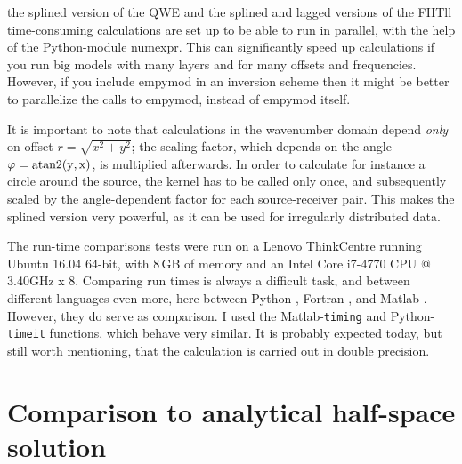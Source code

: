 \documentclass[manuscript,revised]{geophysics}
\begin{document}
  the splined
version of the QWE and the splined and lagged versions of the FHTll time-consuming calculations are set up to be able to
run in parallel, with the help of the Python-module numexpr.  This can
significantly speed up calculations if you run big models with many layers and
for many offsets and frequencies. However, if you include empymod in an
inversion scheme then it might be better to parallelize the calls to empymod,
instead of empymod itself.

It is important to note that calculations in the wavenumber domain depend
\emph{only} on offset $r = \sqrt{x^2+y^2}$; the scaling factor, which depends
on the angle $\varphi = \rm{atan2}(y, x)$, is multiplied afterwards. In order
to calculate for instance a circle around the source, the kernel has to be
called only once, and subsequently scaled by the angle-dependent factor for
each source-receiver pair. This makes the splined version very powerful, as it
can be used for irregularly distributed data.


The run-time comparisons tests were run on a Lenovo ThinkCentre running Ubuntu
16.04 64-bit, with 8\,GB of memory and an Intel Core i7-4770 CPU @ 3.40GHz x
8. Comparing run times is always a
difficult task, and between different languages even more, here between
Python ,
Fortran ,
and Matlab .
However, they do serve as comparison.  I used the
Matlab-\texttt{timing} and Python-\texttt{timeit} functions, which behave
very similar. It is probably expected today, but still worth mentioning, that
the calculation is carried out in double precision.

\section{Comparison to analytical half-space solution}
\end{document}
